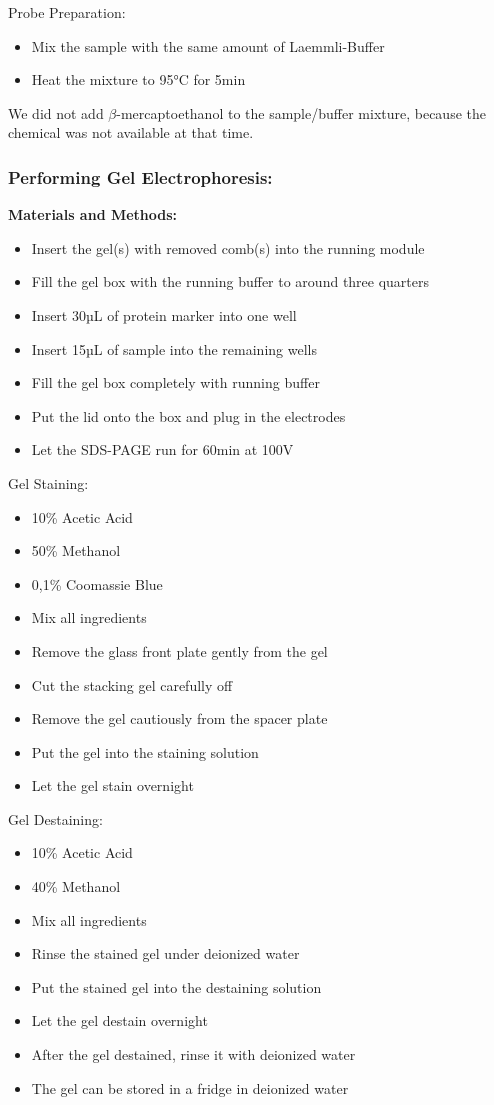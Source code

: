 Probe Preparation:
\begin{itemize}
    \item Mix the sample with the same amount of Laemmli-Buffer
    \item Heat the mixture to 95°C for 5min
\end{itemize}

We did not add \(\beta\)-mercaptoethanol to the sample/buffer mixture, because the chemical was not available at that time.

\subsubsection{Performing Gel Electrophoresis:}
\textbf{Materials and Methods:}
\begin{itemize}
    \item Insert the gel(s) with removed comb(s) into the running module
    \item Fill the gel box with the running buffer to around three quarters
    \item Insert 30µL of protein marker into one well
    \item Insert 15µL of sample into the remaining wells
    \item Fill the gel box completely with running buffer
    \item Put the lid onto the box and plug in the electrodes
    \item Let the SDS-PAGE run for 60min at 100V
\end{itemize}

Gel Staining:
\begin{itemize}
    \item 10\% Acetic Acid
    \item 50\% Methanol
    \item 0,1\% Coomassie Blue
    \item Mix all ingredients
    \item Remove the glass front plate gently from the gel
    \item Cut the stacking gel carefully off
    \item Remove the gel cautiously from the spacer plate
    \item Put the gel into the staining solution
    \item Let the gel stain overnight
\end{itemize}

Gel Destaining:
\begin{itemize}
    \item 10\% Acetic Acid
    \item 40\% Methanol
    \item Mix all ingredients
    \item Rinse the stained gel under deionized water
    \item Put the stained gel into the destaining solution
    \item Let the gel destain overnight
    \item After the gel destained, rinse it with deionized water
    \item The gel can be stored in a fridge in deionized water
\end{itemize}



